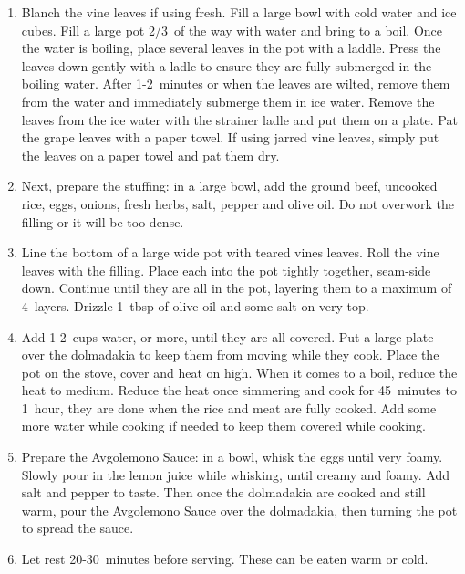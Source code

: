 \begin{enumerate}
    \item Blanch the vine leaves if using fresh. Fill a large bowl with cold water and ice cubes. Fill a large pot 2/3~of the way with water and bring to a boil. Once the water is boiling, place several leaves in the pot with a laddle. Press the leaves down gently with a ladle to ensure they are fully submerged in the boiling water. After 1-2~minutes or when the leaves are wilted, remove them from the water and immediately submerge them in ice water. Remove the leaves from the ice water with the strainer ladle and put them on a plate. Pat the grape leaves with a paper towel. If using jarred vine leaves, simply put the leaves on a paper towel and pat them dry.
    \item Next, prepare the stuffing: in a large bowl, add the ground beef, uncooked rice, eggs, onions, fresh herbs, salt, pepper and olive oil. Do not overwork the filling or it will be too dense.
    \item Line the bottom of a large wide pot with teared vines leaves. Roll the vine leaves with the filling. Place each into the pot tightly together, seam-side down. Continue until they are all in the pot, layering them to a maximum of 4~layers. Drizzle 1~tbsp of olive oil and some salt on very top.
    \item Add 1-2~cups water, or more, until they are all covered. Put a large plate over the dolmadakia to keep them from moving while they cook. Place the pot on the stove, cover and heat on high. When it comes to a boil, reduce the heat to medium. Reduce the heat once simmering and cook for 45~minutes to 1~hour, they are done when the rice and meat are fully cooked. Add some more water while cooking if needed to keep them covered while cooking.
    \item Prepare the Avgolemono Sauce: in a bowl, whisk the eggs until very foamy. Slowly pour in the lemon juice while whisking, until creamy and foamy. Add salt and pepper to taste. Then once the dolmadakia are cooked and still warm, pour the Avgolemono Sauce over the dolmadakia, then turning the pot to spread the sauce.
    \item Let rest 20-30~minutes before serving. These can be eaten warm or cold.
\end{enumerate}

